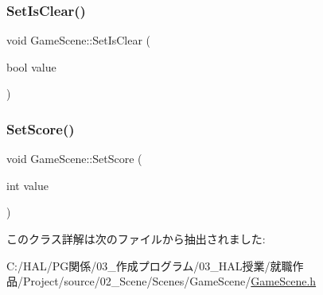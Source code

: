 \subsubsection{\texorpdfstring{Set\+Is\+Clear()}{SetIsClear()}}
{\footnotesize\ttfamily void Game\+Scene\+::\+Set\+Is\+Clear (\begin{DoxyParamCaption}\item[{bool}]{value }\end{DoxyParamCaption})\hspace{0.3cm}{\ttfamily [inline]}}

\mbox{\label{class_game_scene_aec5425818644ea2cb22ccffc89c56378}} 
\subsubsection{\texorpdfstring{Set\+Score()}{SetScore()}}
{\footnotesize\ttfamily void Game\+Scene\+::\+Set\+Score (\begin{DoxyParamCaption}\item[{int}]{value }\end{DoxyParamCaption})\hspace{0.3cm}{\ttfamily [inline]}}



このクラス詳解は次のファイルから抽出されました\+:\begin{DoxyCompactItemize}
\item 
C\+:/\+H\+A\+L/\+P\+G関係/03\+\_\+作成プログラム/03\+\_\+\+H\+A\+L授業/就職作品/\+Project/source/02\+\_\+\+Scene/\+Scenes/\+Game\+Scene/\mbox{\hyperlink{_game_scene_8h}{Game\+Scene.\+h}}\end{DoxyCompactItemize}
